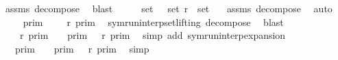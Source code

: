 \begin{isabellebody}
\ assms\ decompose\ \isamarkupfalse%
\ blast\isanewline
\ \ \isamarkupfalse%
\ \isamarkupfalse%
\ {\isacartoucheopen}{\isacharparenleft}set\ {\isasymGamma}{\isacharparenright}\ {\isasymunion}\ {\isacharparenleft}set\ {\isasymGamma}\isactrlsub r{\isacharparenright}\ {\isacharequal}\ set\ {\isasymGamma}{\isacharprime}{\isacartoucheclose}\ \isamarkupfalse%
\ assms\ decompose\ \isamarkupfalse%
\ auto\isanewline
\ \ \isamarkupfalse%
\ \isamarkupfalse%
\ {\isacartoucheopen}{\isasymlbrakk}{\isasymlbrakk}\ {\isasymGamma}{\isacharprime}\ {\isasymrbrakk}{\isasymrbrakk}\isactrlsub p\isactrlsub r\isactrlsub i\isactrlsub m\ {\isacharequal}\ {\isasymlbrakk}{\isasymlbrakk}\ {\isasymGamma}\ {\isacharat}\ {\isasymGamma}\isactrlsub r\ {\isasymrbrakk}{\isasymrbrakk}\isactrlsub p\isactrlsub r\isactrlsub i\isactrlsub m{\isacartoucheclose}\ \isamarkupfalse%
\ symrun{\isacharunderscore}interp{\isacharunderscore}set{\isacharunderscore}lifting\ decompose\ \isamarkupfalse%
\ blast\isanewline
\ \ \isamarkupfalse%
\ \isamarkupfalse%
\ {\isacartoucheopen}{\isasymlbrakk}{\isasymlbrakk}\ {\isasymGamma}\ {\isacharat}\ {\isasymGamma}\isactrlsub r\ {\isasymrbrakk}{\isasymrbrakk}\isactrlsub p\isactrlsub r\isactrlsub i\isactrlsub m\ {\isacharequal}\ {\isasymlbrakk}{\isasymlbrakk}\ {\isasymGamma}\ {\isasymrbrakk}{\isasymrbrakk}\isactrlsub p\isactrlsub r\isactrlsub i\isactrlsub m\ {\isasyminter}\ {\isasymlbrakk}{\isasymlbrakk}\ {\isasymGamma}\isactrlsub r\ {\isasymrbrakk}{\isasymrbrakk}\isactrlsub p\isactrlsub r\isactrlsub i\isactrlsub m{\isacartoucheclose}\ \isamarkupfalse%
\ {\isacharparenleft}simp\ add{\isacharcolon}\ symrun{\isacharunderscore}interp{\isacharunderscore}expansion{\isacharparenright}\isanewline
\ \ \isamarkupfalse%
\ \isamarkupfalse%
\ {\isacartoucheopen}{\isasymlbrakk}{\isasymlbrakk}\ {\isasymGamma}\ {\isasymrbrakk}{\isasymrbrakk}\isactrlsub p\isactrlsub r\isactrlsub i\isactrlsub m\ {\isasymsupseteq}\ {\isasymlbrakk}{\isasymlbrakk}\ {\isasymGamma}\ {\isasymrbrakk}{\isasymrbrakk}\isactrlsub p\isactrlsub r\isactrlsub i\isactrlsub m\ {\isasyminter}\ {\isasymlbrakk}{\isasymlbrakk}\ {\isasymGamma}\isactrlsub r\ {\isasymrbrakk}{\isasymrbrakk}\isactrlsub p\isactrlsub r\isactrlsub i\isactrlsub m{\isacartoucheclose}\ \isamarkupfalse%
\ simp\isanewline
\ \ \isamarkupfalse%
\ \isamarkupfalse%

\end{isabellebody}
